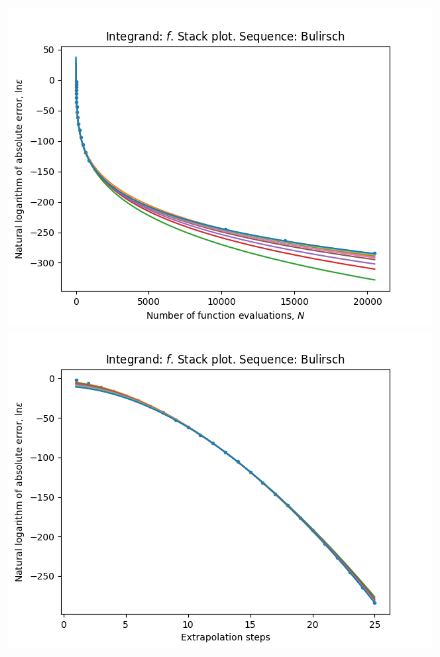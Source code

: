 \begin{figure}[H]
\centering
\begin{minipage}{0.45\textwidth}
\centering
\includegraphics[scale=0.45]{../results/romberg_plots/cos_squared_hp_bulirsch_stack.png}
\end{minipage}
\begin{minipage}{0.45\textwidth}
\centering
\includegraphics[scale=0.45]{../results/romberg_plots/cos_squared_hp_bulirsch_steps_stack.png}
\end{minipage}
\end{figure}

